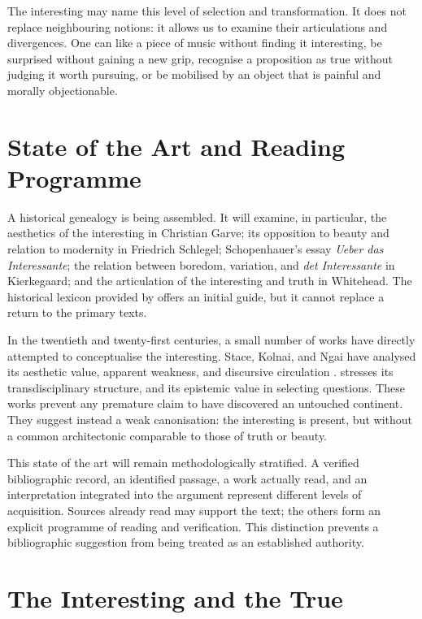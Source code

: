 \documentclass[11pt,a4paper]{article}
\begin{document}
The interesting may name this level of selection and transformation. It does
not replace neighbouring notions: it allows us to examine their articulations
and divergences. One can like a piece of music without finding it interesting,
be surprised without gaining a new grip, recognise a proposition as true
without judging it worth pursuing, or be mobilised by an object that is painful
and morally objectionable.

\section{State of the Art and Reading Programme}

A historical genealogy is being assembled. It will examine, in particular, the
aesthetics of the interesting in Christian Garve; its opposition to beauty and
relation to modernity in Friedrich Schlegel; Schopenhauer's essay
\emph{Ueber das Interessante}; the relation between boredom, variation, and
\emph{det Interessante} in Kierkegaard; and the articulation of the interesting
and truth in Whitehead. The historical lexicon provided by
\textcite{nannini2018interesting} offers an initial guide, but it cannot replace
a return to the primary texts.

In the twentieth and twenty-first centuries, a small number of works have
directly attempted to conceptualise the interesting. Stace, Kolnai, and Ngai
have analysed its aesthetic value, apparent weakness, and discursive circulation
\parencite{stace1944interestingness,kolnai1964concept,ngai2008merely,ngai2012categories}.
\textcite{epstein2009interesting} stresses its transdisciplinary structure, and
\textcite{grimm2011interesting} its epistemic value in selecting questions.
These works prevent any premature claim to have discovered an untouched
continent. They suggest instead a weak canonisation: the interesting is present,
but without a common architectonic comparable to those of truth or beauty.

This state of the art will remain methodologically stratified. A verified
bibliographic record, an identified passage, a work actually read, and an
interpretation integrated into the argument represent different levels of
acquisition. Sources already read may support the text; the others form an
explicit programme of reading and verification. This distinction prevents a
bibliographic suggestion from being treated as an established authority.

\section{The Interesting and the True}
\end{document}
